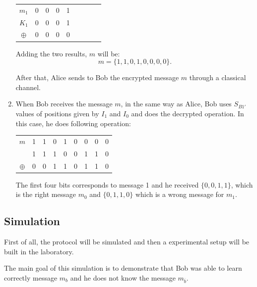 \begin{enumerate}
   \begin{table}[H]
    \centering
    \begin{tabular}{c|c c c c c c c c}
     $m_{1}$ & 0 & 0 & 0 & 1 \\
     $K_{1}$ & 0 & 0 & 0 & 1 \\ \hline
     $\oplus$ & 0 & 0 & 0 & 0
    \end{tabular}
    \end{table}

    Adding the two results, $m$ will be: $$m=\{1,1,0,1,0,0,0,0\}.$$

   After that, Alice sends to Bob the encrypted message $m$ through a classical channel.

  \item When Bob receives the message $m$, in the same way as Alice, Bob uses $S_{B1\prime}$ values of positions given by $I_{1}$ and $I_{0}$ and does the decrypted operation. In this case, he does following operation:

      \begin{table}[H]
        \centering
        \begin{tabular}{c|c c c c c c c c}
         $m$ & 1 & 1 & 0 & 1 & 0 & 0 & 0 & 0 \\
             & 1 & 1 & 1 & 0 & 0 & 1 & 1 & 0 \\ \hline
         $\oplus$ & 0 & 0 & 1 & 1 & 0 & 1 & 1 & 0 \\
        \end{tabular}
        \end{table}

      The first four bits corresponds to message 1 and he received $\{0,0,1,1\}$, which is the right message $m_{0}$ and $\{0,1,1,0\}$ which is a wrong message for $m_{1}$.


\end{enumerate}

\subsection{Simulation}

First of all, the protocol will be simulated and then a experimental setup will be built in the laboratory.

The main goal of this simulation is to demonstrate that Bob was able to learn correctly message $m_{b}$ and he does not know the message $m_{\overline{b}}$.

